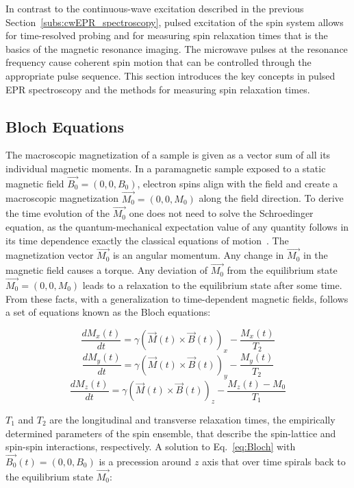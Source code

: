 In contrast to the continuous-wave excitation described in the previous Section~\ref{subs:cwEPR_spectroscopy}, pulsed excitation of the spin system allows for time-resolved probing and for measuring spin relaxation times that is the basics of the magnetic resonance imaging. The microwave pulses at the resonance frequency cause coherent spin motion that can be controlled through the appropriate pulse sequence. This section introduces the key concepts in pulsed EPR spectroscopy and the methods for measuring spin relaxation times.

\subsection{Bloch Equations}
The macroscopic magnetization of a sample is given as a vector sum of all its individual magnetic moments. In a paramagnetic sample exposed to a static magnetic field $\vec{B_0}=\left(0,0,B_0\right)$, electron spins align with the field and create a macroscopic magnetization $\vec{M_0}=\left(0,0,M_0\right)$ along the field direction. To derive the time evolution of the $\vec{M_0}$ one does not need to solve the Schroedinger equation, as the quantum-mechanical expectation value of any quantity follows in its time dependence exactly the classical equations of motion~\cite{Bloch_1946}. The magnetization vector $\vec{M_0}$ is an angular momentum. Any change in $\vec{M_0}$ in the magnetic field causes a torque. Any deviation of $\vec{M_0}$ from the equilibrium state $\vec{M_0}=\left(0,0,M_0\right)$ leads to a relaxation to the equilibrium state after some time. From these facts, with a generalization to time-dependent magnetic fields, follows a set of equations known as the Bloch equations:

\begin{equation}
\label{eq:Bloch}
\frac{dM_x(t)}{dt} = \gamma\left(\vec{M}(t)\times\vec{B}(t)\right)_x - \frac{M_x(t)}{T_2}
\end{equation}
\begin{equation}
\nonumber
\frac{dM_y(t)}{dt} = \gamma\left(\vec{M}(t)\times\vec{B}(t)\right)_y - \frac{M_y(t)}{T_2}
\end{equation}
\begin{equation}
\nonumber
\frac{dM_z(t)}{dt} = \gamma\left(\vec{M}(t)\times\vec{B}(t)\right)_z - \frac{M_z(t)-M_0}{T_1}
\end{equation}

$T_1$ and $T_2$ are the longitudinal and transverse relaxation times, the empirically determined parameters of the spin ensemble, that describe the spin-lattice and spin-spin interactions, respectively. A solution to Eq.~\ref{eq:Bloch} with $\vec{B_0}(t) = \left(0,0,B_0\right)$ is a precession around $z$ axis that over time spirals back to the equilibrium state $\vec{M_0}$:


